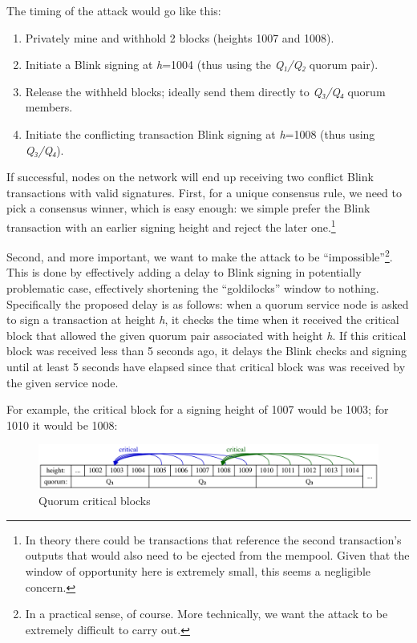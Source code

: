 The timing of the attack would go like this:

\begin{enumerate}
\def\labelenumi{\arabic{enumi}.}
\tightlist
\item
  Privately mine and withhold 2 blocks (heights 1007 and 1008).
\item
  Initiate a Blink signing at \emph{h}=1004 (thus using the \emph{Q₁/Q₂}
  quorum pair).
\item
  Release the withheld blocks; ideally send them directly to
  \emph{Q₃/Q₄} quorum members.
\item
  Initiate the conflicting transaction Blink signing at \emph{h}=1008
  (thus using \emph{Q₃/Q₄}).
\end{enumerate}

If successful, nodes on the network will end up receiving two conflict
Blink transactions with valid signatures. First, for a unique consensus
rule, we need to pick a consensus winner, which is easy enough: we
simple prefer the Blink transaction with an earlier signing height and
reject the later one.\footnote{In theory there could be transactions
  that reference the second transaction's outputs that would also need
  to be ejected from the mempool. Given that the window of opportunity
  here is extremely small, this seems a negligible concern.}

Second, and more important, we want to make the attack to be
``impossible''\footnote{In a practical sense, of course. More
  technically, we want the attack to be extremely difficult to carry
  out.}. This is done by effectively adding a delay to Blink signing in
potentially problematic case, effectively shortening the ``goldilocks''
window to nothing. Specifically the proposed delay is as follows: when a
quorum service node is asked to sign a transaction at height \emph{h},
it checks the time when it received the critical block that allowed the
given quorum pair associated with height \emph{h}. If this critical
block was received less than 5 seconds ago, it delays the Blink checks
and signing until at least 5 seconds have elapsed since that critical
block was was received by the given service node.

For example, the critical block for a signing height of 1007 would be
1003; for 1010 it would be 1008:

\begin{figure}
\centering
\includegraphics{quorum-critical.svg}
\caption{Quorum critical blocks}
\end{figure}

